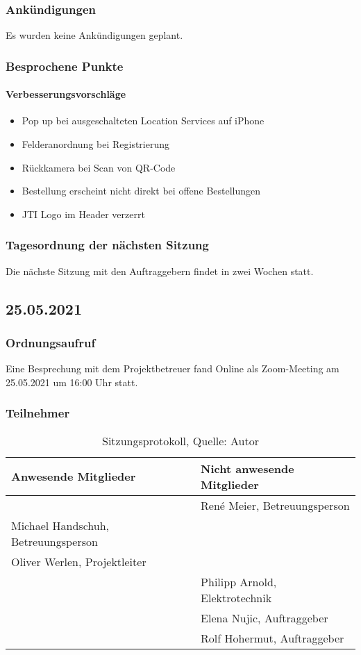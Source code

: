\subsubsection{Ankündigungen}
Es wurden keine Ankündigungen geplant.
\subsubsection{Besprochene Punkte}
\paragraph{Verbesserungsvorschläge}
\begin{itemize}
	\item Pop up bei ausgeschalteten Location Services auf iPhone
	\item Felderanordnung bei Registrierung
	\item Rückkamera bei Scan von QR-Code
	\item Bestellung erscheint nicht direkt bei offene Bestellungen 
	\item JTI Logo im Header verzerrt
\end{itemize}
\subsubsection{Tagesordnung der nächsten Sitzung}
Die nächste Sitzung mit den Auftraggebern findet in zwei Wochen statt. 
\newpage
\subsection{25.05.2021}
\subsubsection{Ordnungsaufruf}
Eine Besprechung mit dem Projektbetreuer fand Online als Zoom-Meeting am 25.05.2021 um 16:00 Uhr statt.
\subsubsection{Teilnehmer}
\begin{table}[H]
	\setlength\extrarowheight{2pt} %
	\begin{tabularx}{\textwidth}{|X|X|}
		\hline
		\textbf{Anwesende Mitglieder} &  \textbf{Nicht anwesende Mitglieder} \\
		\hline
		& René Meier, Betreuungsperson  \\
		Michael Handschuh, Betreuungsperson &   \\
		Oliver Werlen, Projektleiter &  \\
		& Philipp Arnold, Elektrotechnik  \\
		& Elena Nujic, Auftraggeber  \\
		& Rolf Hohermut, Auftraggeber  \\
		\hline
	\end{tabularx}
	\caption{ \label{tbl: Teilnehmerliste vom 25.05.2021}Sitzungsprotokoll, Quelle: Autor}
\end{table}

